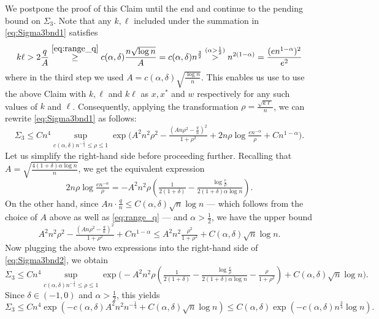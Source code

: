 \documentclass[11pt,reqno,letterpaper]{amsart}
\numberwithin{equation}{section}
\theoremstyle{plain}
\begin{document}
We postpone the proof of this Claim until the end and continue to the pending 
bound on $\Sigma_3$. Note that any $k, \ell$ included under the summation in 
\eqref{eq:Sigma3bnd1} satisfies
\begin{equation}\label{eq:kell_bnd1}
k\ell > 2 \frac q{A} \stackrel{\eqref{eq:range_q}}{\ge} c(\alpha, \delta) \frac{n\sqrt{\log n}}{A} = c(\alpha, \delta) n^{\frac32} \stackrel{(\alpha > \frac12)}{>} n^{2(1 - \alpha)} = \frac{(e n^{1 - \alpha})^2}{e^2}\end{equation}
where in the third step we used $A = c(\alpha, \delta)\sqrt{\frac{\log n}{n}}$. 
This enables us use to use the above Claim with $k, \ell$ and $k\ell$ as $x, x^\ast$ 
and $w$ respectively for any such values of $k$ and $\ell$. Consequently, applying 
the transformation $\rho = \frac{\sqrt{k\ell}}n$, we can rewrite 
\eqref{eq:Sigma3bnd1} as follows:
\begin{equation}\label{eq:Sigma3bnd2}
\Sigma_3 \le C n^4 \sup_{c(\alpha, \delta)n^{-\frac14} \le \rho \le 1} \exp\big(A^2n^2 \rho^2 - \tfrac{(An\rho^2 - \tfrac qn)^2}{1 + \rho^2} + 2n \rho \log \tfrac{en^{-\alpha}}{\rho} 
+ C n^{1 - \alpha}\big).
\end{equation}
Let us simplify the right-hand side before proceeding further. Recalling that $A = 
\sqrt{\frac{4(1+\delta)\alpha\log n}n}$, we get the equivalent expression
\begin{equation*}
2n \rho \log \tfrac{en^{-\alpha}}{\rho} = -A^2n^2\rho(\tfrac 1{2(1 + \delta)} - \tfrac{\log \frac e{\rho}}{2(1 + \delta)\alpha \log n}).
\end{equation*}
On the other hand, since $An \cdot \frac qn \le C(\alpha, \delta)\sqrt{n}\log n$ --- which follows from the choice of $A$ above as well as \eqref{eq:range_q} --- and 
$\alpha > \frac 12$, we have the upper bound
\begin{equation*}
A^2n^2\rho^2 - \tfrac{(An\rho^2 - \tfrac qn)^2}{1 + \rho^2} + Cn^{1 - \alpha} \le A^2n^2\tfrac{\rho^2}{1 + \rho^2} + C(\alpha, \delta)\sqrt{n}\log n.
\end{equation*}
Now plugging the above two expressions into the right-hand side of 
\eqref{eq:Sigma3bnd2}, we obtain
\begin{equation*}%
\Sigma_3 \le C n^4 \sup_{c(\alpha, \delta)n^{-\frac14} \le \rho \le 1} \exp\big(-A^2n^2 \rho(\tfrac 1{2(1 + \delta)} - \tfrac{\log \frac e{\rho}}{2(1 + \delta)\alpha \log n} - \tfrac{\rho}{1 + \rho^2}) + C(\alpha, \delta)\sqrt{n}\log n\big).
\end{equation*}
Since $\delta \in (-1, 0)$ and $\alpha > \frac 12$, this yields
\begin{equation}\label{eq:Sigma3bnd4}
\Sigma_3 \le C n^4\exp(-c(\alpha, \delta) A^2n^2n^{-\frac14} + C(\alpha, \delta)\sqrt{n}\log n)  \le C(\alpha, \delta) \exp(-c(\alpha, \delta) n^{\frac34}\log n).
\end{equation}
\end{document}
